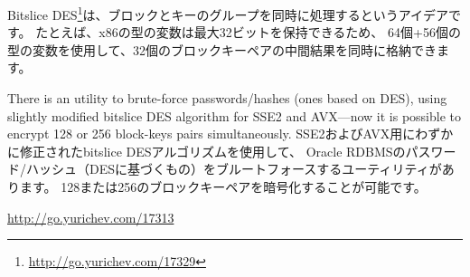 \label{bitslicedes}
\newcommand{\URLBS}{\url{http://go.yurichev.com/17329}}

Bitslice DES\footnote{\URLBS}は、ブロックとキーのグループを同時に処理するというアイデアです。
たとえば、x86の型の変数は最大32ビットを保持できるため、
64個+56個の型の変数を使用して、32個のブロックキーペアの中間結果を同時に格納できます。

\myindex{\oracle}
There is an utility to brute-force \oracle passwords/hashes (ones based on DES),
using slightly modified bitslice DES algorithm for SSE2 and AVX---now it is possible to encrypt 128 
or 256 block-keys pairs simultaneously.
SSE2およびAVX用にわずかに修正されたbitslice DESアルゴリズムを使用して、
Oracle RDBMSのパスワード/ハッシュ（DESに基づくもの）をブルートフォースするユーティリティがあります。
128または256のブロックキーペアを暗号化することが可能です。

\url{http://go.yurichev.com/17313}




